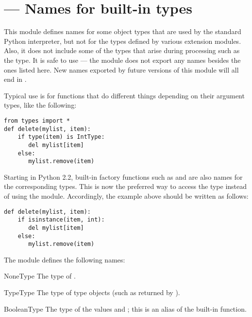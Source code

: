 \section{ ---
         Names for built-in types}



This module defines names for some object types that are used by
the standard Python interpreter, but not for the types defined by various
extension modules.  Also, it does not include some of the types that
arise during processing such as the  type.
It is safe to use  ---
the module does not export any names besides the ones listed here.
New names exported by future versions of this module will all end in
.

Typical use is for functions that do different things depending on
their argument types, like the following:

\begin{verbatim}
from types import *
def delete(mylist, item):
    if type(item) is IntType:
       del mylist[item]
    else:
       mylist.remove(item)
\end{verbatim}

Starting in Python 2.2, built-in factory functions such as
 and  are also names for the
corresponding types.  This is now the preferred way to access
the type instead of using the  module.  Accordingly,
the example above should be written as follows:

\begin{verbatim}
def delete(mylist, item):
    if isinstance(item, int):
       del mylist[item]
    else:
       mylist.remove(item)
\end{verbatim}

The module defines the following names:

\begin{datadesc}{NoneType}
The type of .
\end{datadesc}

\begin{datadesc}{TypeType}
The type of type objects (such as returned by
).
\end{datadesc}

\begin{datadesc}{BooleanType}
The type of the  values  and ; this
is an alias of the built-in  function.
\end{datadesc}

